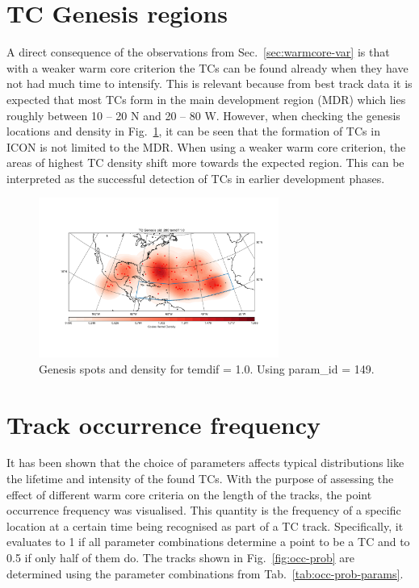 \section{TC Genesis regions}
A direct consequence of the observations from Sec.~\ref{sec:warmcore-var} is that with a weaker warm core criterion the TCs can be found already when they have not had much time to intensify. This is relevant because from best track data it is expected that most TCs form in the main development region (MDR) which lies roughly between 10 -- 20 \degree N and 20 -- 80 \degree W. However, when checking the genesis locations and density in Fig.~\ref{fig:genesis-temdif1}, it can be seen that the formation of TCs in ICON is not limited to the MDR. When using a weaker warm core criterion, the areas of highest TC density shift more towards the expected region. This can be interpreted as the successful detection of TCs in earlier development phases.
\begin{figure}[!htb]
	\centering
	\includegraphics[width=0.7\textwidth]{img/genesis_plot_temdif1.pdf}
	\caption{Genesis spots and density for temdif = 1.0. Using param\_id = 149.}
	\label{fig:genesis-temdif1}
\end{figure}

\section{Track occurrence frequency }
It has been shown that the choice of parameters affects typical distributions like the lifetime and intensity of the found TCs. With the purpose of assessing the effect of different warm core criteria on the length of the tracks, the point occurrence frequency was visualised. This quantity is the frequency of a specific location at a certain time being recognised as part of a TC track. Specifically, it evaluates to 1 if all parameter combinations determine a point to be a TC and to 0.5 if only half of them do. The tracks shown in Fig.~\ref{fig:occ-prob} are determined using the parameter combinations from Tab.~\ref{tab:occ-prob-params}.

